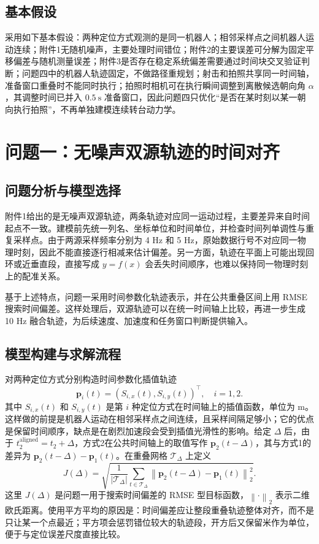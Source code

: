 \documentclass{cumcmthesis}
\newcommand{\norm}[1]{\left\lVert #1 \right\rVert}
\begin{document}
\subsection{基本假设}
采用如下基本假设：两种定位方式观测的是同一机器人；相邻采样点之间机器人运动连续；附件1无随机噪声，主要处理时间错位；附件2的主要误差可分解为固定平移偏差与随机测量误差；附件3是否存在稳定系统偏差需要通过时间块交叉验证判断；问题四中的机器人轨迹固定，不做路径重规划；射击和拍照共享同一时间轴，准备窗口重叠时不能同时执行；拍照时相机可在执行瞬间调整到离散候选朝向角 $\alpha$，其调整时间已并入 $0.5\ \mathrm{s}$ 准备窗口，因此问题四只优化“是否在某时刻以某一朝向执行拍照”，不再单独建模连续转台动力学。

\section{问题一：无噪声双源轨迹的时间对齐}
\subsection{问题分析与模型选择}
附件1给出的是无噪声双源轨迹，两条轨迹对应同一运动过程，主要差异来自时间起点不一致。建模前先统一列名、坐标单位和时间单位，并检查时间列单调性与重复采样点。由于两源采样频率分别为 4 Hz 和 5 Hz，原始数据行号不对应同一物理时刻，因此不能直接逐行相减来估计偏差。另一方面，轨迹在平面上可能出现回环或近垂直段，直接写成 $y=f(x)$ 会丢失时间顺序，也难以保持同一物理时刻上的配准关系。

基于上述特点，问题一采用时间参数化轨迹表示，并在公共重叠区间上用 RMSE 搜索时间偏差。这样处理后，双源轨迹可以在统一时间轴上比较，再进一步生成 10 Hz 融合轨迹，为后续速度、加速度和任务窗口判断提供输入。

\subsection{模型构建与求解流程}
对两种定位方式分别构造时间参数化插值轨迹
\begin{equation}
  \bm p_i(t)=\left(S_{i,x}(t),S_{i,y}(t)\right)^\top,\quad i=1,2.
\end{equation}
其中 $S_{i,x}(t)$ 和 $S_{i,y}(t)$ 是第 $i$ 种定位方式在时间轴上的插值函数，单位为 m。这样做的前提是机器人运动在相邻采样点之间连续，且采样间隔足够小；它的优点是保留时间顺序，缺点是在剧烈加速段会受到插值光滑性的影响。给定 $\Delta$ 后，由于 $t_2^{\mathrm{aligned}}=t_2+\Delta$，方式2在公共时间轴上的取值写作 $\bm p_2(t-\Delta)$，其与方式1的差异为 $\bm p_2(t-\Delta)-\bm p_1(t)$。在重叠网格 $\mathcal T_\Delta$ 上定义
\begin{equation}
  J(\Delta)=\sqrt{\frac{1}{|\mathcal T_\Delta|}\sum_{t\in\mathcal T_\Delta}
  \norm{\bm p_2(t-\Delta)-\bm p_1(t)}_2^2}.
\end{equation}
这里 $J(\Delta)$ 是问题一用于搜索时间偏差的 RMSE 型目标函数，$\norm{\cdot}_2$ 表示二维欧氏距离。使用平方平均的原因是：时间偏差应让整段重叠轨迹整体对齐，而不是只让某一个点最近；平方项会惩罚错位较大的轨迹段，开方后又保留米作为单位，便于与定位误差尺度直接比较。
\end{document}

